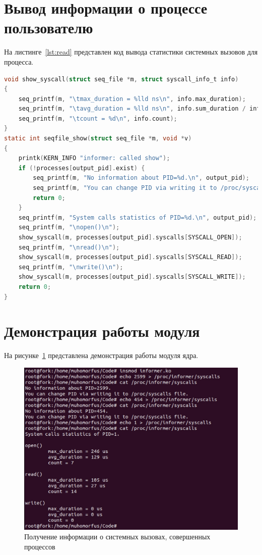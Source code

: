 \section{Вывод информации о процессе пользователю}

На листинге~\ref{lst:read} представлен код вывода статистики системных вызовов для процесса.

\begin{lstlisting}[language=C, label=lst:read, caption={Вывод статистики системных вызовов для процесса}]
void show_syscall(struct seq_file *m, struct syscall_info_t info)
{
    seq_printf(m, "\tmax_duration = %lld ns\n", info.max_duration);
    seq_printf(m, "\tavg_duration = %lld ns\n", info.sum_duration / info.count);
    seq_printf(m, "\tcount = %d\n", info.count);
}
static int seqfile_show(struct seq_file *m, void *v)
{
    printk(KERN_INFO "informer: called show");
    if (!processes[output_pid].exist) {
        seq_printf(m, "No information about PID=%d.\n", output_pid);
        seq_printf(m, "You can change PID via writing it to /proc/syscalls file.\n");
        return 0;
    }
    seq_printf(m, "System calls statistics of PID=%d.\n", output_pid);
    seq_printf(m, "\nopen()\n");
    show_syscall(m, processes[output_pid].syscalls[SYSCALL_OPEN]);
    seq_printf(m, "\nread()\n");
    show_syscall(m, processes[output_pid].syscalls[SYSCALL_READ]);
    seq_printf(m, "\nwrite()\n");
    show_syscall(m, processes[output_pid].syscalls[SYSCALL_WRITE]);
    return 0;
}
\end{lstlisting}

\section{Демонстрация работы модуля}

На рисунке~\ref{img:demo} представлена демонстрация работы модуля ядра.

\begin{figure}[h!]
    \centering
    \includegraphics[width=\textwidth]{assets/demo.jpeg}
    \caption{Получение информации о системных вызовах, совершенных процессов}
    \label{img:demo}
\end{figure}

